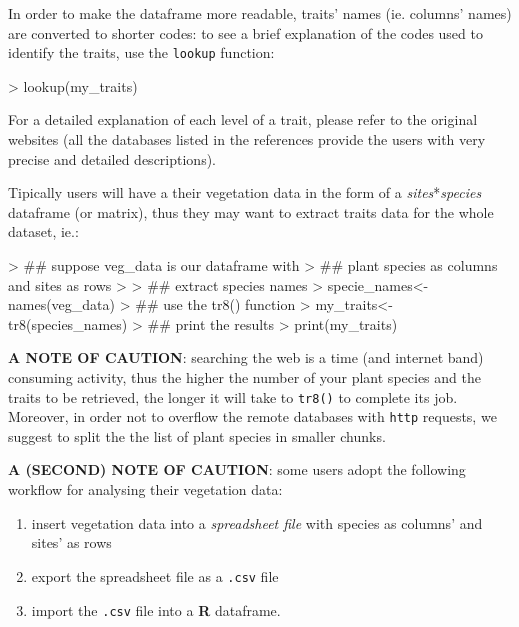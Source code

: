 \documentclass{article}
\begin{document}

  
  
  In order to make the dataframe more readable,  traits' names (ie. columns' names) are converted to shorter codes: to see a brief explanation of the codes used to identify the traits, use the \texttt{lookup} function: 


\begin{Schunk}
\begin{Sinput}
> lookup(my_traits)
\end{Sinput}
\end{Schunk}

  For a detailed explanation of each level of a trait, please refer to
  the original websites (all the databases listed in the references
  provide the users with very precise and detailed descriptions).


   Tipically users will have a their vegetation data in the form of a
   \textit{sites}*\textit{species} dataframe (or matrix), thus they
   may want to extract traits data for the whole dataset, ie.:
   
\begin{Schunk}
\begin{Sinput}
> ## suppose veg_data is our dataframe with
> ## plant species as columns and sites as rows
> 
> ## extract species names
> specie_names<-names(veg_data)
> ## use the tr8() function
> my_traits<-tr8(species_names)
> ## print the results
> print(my_traits)
\end{Sinput}
\end{Schunk}
  
  \textbf{A NOTE OF CAUTION}: searching the web is a time (and
  internet band) consuming activity, thus the higher the number of
  your plant species and the traits to be retrieved, the longer it will take to \texttt{tr8()} to complete its job. Moreover, in order
  not to overflow the remote databases with \texttt{http} requests, we
  suggest to split the the list of plant species in smaller chunks.

  \textbf{A (SECOND) NOTE OF CAUTION}: some users adopt the following workflow for analysing their vegetation data:

  \begin{enumerate}
  \item insert vegetation data into a \textit{spreadsheet file} with species as
  columns' and sites' as rows
\item export the spreadsheet file as a \texttt{.csv} file
\item import the \texttt{.csv} file into a \textbf{R} dataframe.
  \end{enumerate}
  
\end{document}
